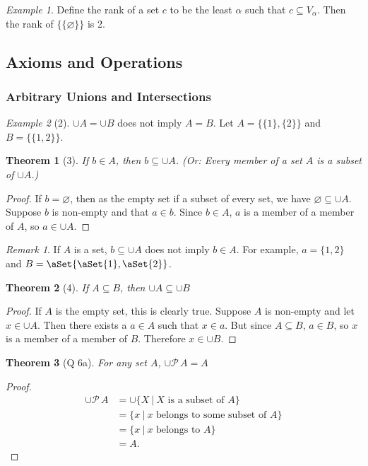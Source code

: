 \documentclass[12pt]{article}
\theoremstyle{plain}
\newtheorem*{exthm}{Theorem}
\theoremstyle{remark}
\newtheorem*{eg}{Example}
\theoremstyle{definition}
\theoremstyle{remark}
\newtheorem*{remark}{Remark}
\newcommand{\powerset}{\mathscr{P}\,}
\DeclarePairedDelimiter\aSet\{\}
\begin{document}
\begin{eg}
  Define the rank of a set $c$ to be the least $\alpha$ such that $c \subseteq V_\alpha$. Then the rank of $\{\{\varnothing\}\}$ is 2.
\end{eg}

\subsection{Axioms and Operations}

\subsubsection{Arbitrary Unions and Intersections}
\begin{eg}[2]
  $\cup A = \cup B$ does not imply $A = B$.
  Let $A = \{\{1\}, \{2\}\}$ and $B = \{\{1, 2\}\}$.
\end{eg}

\begin{exthm}[3]\label{memberUnion}
  If $b \in A$, then $b \subseteq \cup A$. (Or: Every member of a set $A$ is a subset of $\cup A$.)
\end{exthm}
\begin{proof}
  If $b = \varnothing$, then as the empty set if a subset of every set, we have $\varnothing \subseteq \cup A$.  Suppose $b$ is non-empty and that $a \in b$. Since $b \in A$, $a$ is a member of a member of $A$, so $a \in \cup A$.
\end{proof}
\begin{remark}
  If $A$ is a set, $b \subseteq \cup A$ does not imply $b \in A$. For example, $a = \{1,2\}$ and $B = \aSet{\aSet{1}, \aSet{2}}$.
\end{remark}

\begin{exthm}[4]
  If $A \subseteq B$, then $\cup A \subseteq \cup B$
\end{exthm}
\begin{proof}
  If $A$ is the empty set, this is clearly true. Suppose $A$ is non-empty and let $x \in \cup A$. Then there exists a $a \in A$ such that $x \in a$. But since $A \subseteq B$, $a \in B$, so $x$ is a member of a member of $B$. Therefore $x \in \cup B$.
\end{proof}

\begin{exthm}[Q 6a]
  For any set $A$, $\cup \powerset A = A$
\end{exthm}
\begin{proof}
  \begin{align*}
    \cup \powerset A &= \cup \{X\ |\ \text{$X$ is a subset of $A$} \}\\
                     &= \{x\ |\ \text{$x$ belongs to some subset of $A$}\}\\
                     &= \{x\ |\ \text{$x$ belongs to $A$}\}\\
                     &= A.
  \end{align*}
\end{proof}
\end{document}
